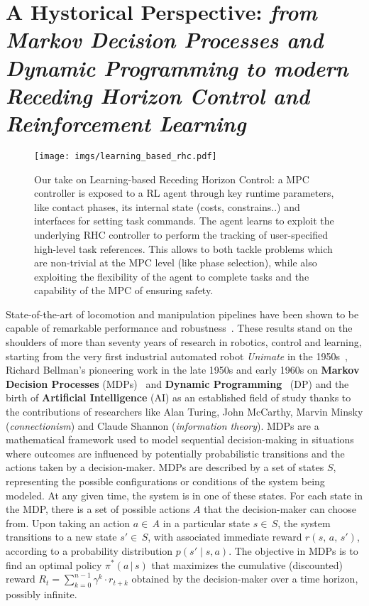 \section{A Hystorical Perspective: \textnormal{\textit{from Markov Decision Processes and Dynamic Programming to modern Receding Horizon Control and Reinforcement Learning}}}
\begin{figure*}[t]
	\centering
	\vspace{0.1cm}
	\texttt{[image: imgs/learning\_based\_rhc.pdf]}
	\caption{Our take on Learning-based Receding Horizon Control: a MPC controller is exposed to a RL agent through key runtime parameters, like contact phases, its internal state (costs, constrains..) and interfaces for setting task commands. The agent learns to exploit the underlying RHC controller to perform the tracking of user-specified high-level task references. This allows to both tackle problems which are non-trivial at the MPC level (like phase selection), while also exploiting the flexibility of the agent to complete tasks and the capability of the MPC of ensuring safety.}
	\label{fig:lrhc_arch}
\end{figure*}
State-of-the-art of locomotion and manipulation pipelines have been shown to be capable of remarkable performance and robustness~\cite{rl:schneider2023learning,rl:miki2024learning,web::atlas_grip_boston_dyn,web::lrhc_boston_dyn}. These results stand on the shoulders of more than seventy years of research in robotics, control and learning, starting from the very first industrial automated robot \textit{Unimate} in the 1950s~\cite{origins:xu2018fourth}, Richard Bellman's pioneering work in the late 1950s and early 1960s on \textbf{Markov Decision Processes} (MDPs)~\cite{rl:bellman1957markovian} and \textbf{Dynamic Programming}~\cite{rl:bellman1960dynamic} (DP) and the birth of \textbf{Artificial Intelligence} (AI) as an established field of study thanks to the contributions of researchers like Alan Turing, John McCarthy, Marvin Minsky (\textit{connectionism}) and Claude Shannon (\textit{information theory}).
MDPs are a mathematical framework used to model sequential decision-making in situations where outcomes are influenced by potentially probabilistic transitions and the actions taken by a decision-maker. MDPs are described by a set of states $S$, representing the possible configurations or conditions of the system being modeled. At any given time, the system is in one of these states. For each state in the MDP, there is a set of possible actions $A$ that the decision-maker can choose from. Upon taking an action $a\in\,A$ in a particular state $s\in\,S$, the system transitions to a new state $s'\in\,S$, with associated immediate reward $r(s,\,a,\,s')$, according to a probability distribution $p(s'\mid s, a)$. The objective in MDPs is to find an optimal policy $\pi^{*}(a\,\vert\,s)$ that maximizes the cumulative (discounted) reward $R_t = \sum_{k=0}^{n-1} \gamma^k \cdot r_{t+k}$ obtained by the decision-maker over a time horizon, possibly infinite.
